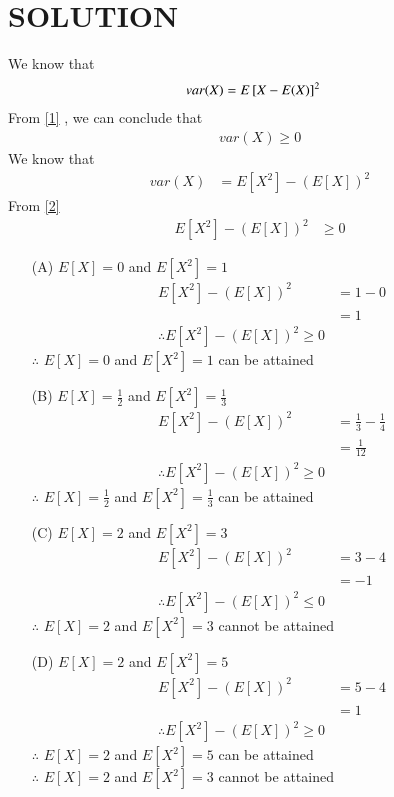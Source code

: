 \documentclass[journal,12pt,twocolumn]{IEEEtran}
\begin{document}
\section*{SOLUTION}
We know that 
\begin{align}
var(X)&=E{}\left[X-E(X)\right]^2 \label{1}
\end{align}
From \eqref{1} , we can conclude that 
\begin{align}
var(X) \geq 0 \label{2}
\end{align}
We know that 
\begin{align}
var(X)&=E[X^2]-(E[X])^2 \label{3}
\end{align}
From \eqref{2}
\begin{align}
E[X^2]-(E[X])^2 & \geq 0
\end{align}
\begin{enumerate}
\item[(A)] $E[X]=0$ and $E[X^2]=1$
\begin{align}
E[X^2]-(E[X])^2 &=1 - 0\\
&=1\\
\therefore E[X^2]-(E[X])^2 \geq 0
\end{align}
$\therefore$ $E[X]=0$ and $E[X^2]=1$ can be attained
\item[(B)] $E[X]=\frac{1}{2}$ and $E[X^2]=\frac{1}{3}$
\begin{align}
E[X^2]-(E[X])^2 &=\frac{1}{3} - \frac{1}{4}\\
&=\frac{1}{12}\\
\therefore E[X^2]-(E[X])^2 \geq 0
\end{align}
$\therefore$ $E[X]=\frac{1}{2}$ and $E[X^2]=\frac{1}{3}$ can be attained
\item[(C)] $E[X]=2$ and $E[X^2]=3$
\begin{align}
E[X^2]-(E[X])^2 &=3 - 4\\
&=-1\\
\therefore E[X^2]-(E[X])^2 \leq 0
\end{align}
$\therefore$ $E[X]=2$ and $E[X^2]=3$ cannot be attained
\item[(D)] $E[X]=2$ and $E[X^2]=5$
\begin{align}
E[X^2]-(E[X])^2 &=5 - 4\\
&=1\\
\therefore E[X^2]-(E[X])^2 \geq 0
\end{align}
$\therefore$ $E[X]=2$ and $E[X^2]=5$ can be attained\\
$\therefore$ $E[X]=2$ and $E[X^2]=3$ cannot be attained
\end{enumerate}
\end{document}
